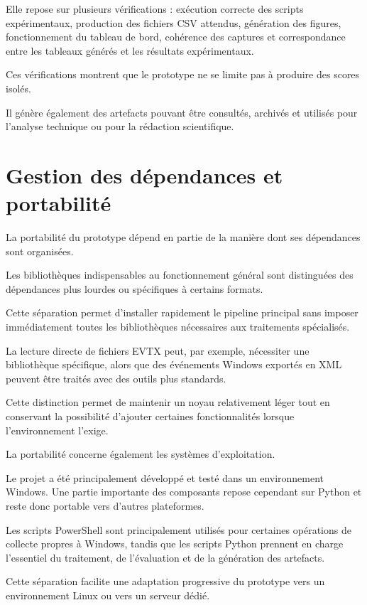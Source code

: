 Elle repose sur plusieurs vérifications : exécution correcte des scripts expérimentaux, production des fichiers CSV attendus, génération des figures, fonctionnement du tableau de bord, cohérence des captures et correspondance entre les tableaux générés et les résultats expérimentaux.

Ces vérifications montrent que le prototype ne se limite pas à produire des scores isolés.

Il génère également des artefacts pouvant être consultés, archivés et utilisés pour l'analyse technique ou pour la rédaction scientifique.

\section{Gestion des dépendances et portabilité}

La portabilité du prototype dépend en partie de la manière dont ses dépendances sont organisées.

Les bibliothèques indispensables au fonctionnement général sont distinguées des dépendances plus lourdes ou spécifiques à certains formats.

Cette séparation permet d'installer rapidement le pipeline principal sans imposer immédiatement toutes les bibliothèques nécessaires aux traitements spécialisés.

La lecture directe de fichiers EVTX peut, par exemple, nécessiter une bibliothèque spécifique, alors que des événements Windows exportés en XML peuvent être traités avec des outils plus standards.

Cette distinction permet de maintenir un noyau relativement léger tout en conservant la possibilité d'ajouter certaines fonctionnalités lorsque l'environnement l'exige.

La portabilité concerne également les systèmes d'exploitation.

Le projet a été principalement développé et testé dans un environnement Windows. Une partie importante des composants repose cependant sur Python et reste donc portable vers d'autres plateformes.

Les scripts PowerShell sont principalement utilisés pour certaines opérations de collecte propres à Windows, tandis que les scripts Python prennent en charge l'essentiel du traitement, de l'évaluation et de la génération des artefacts.

Cette séparation facilite une adaptation progressive du prototype vers un environnement Linux ou vers un serveur dédié.
